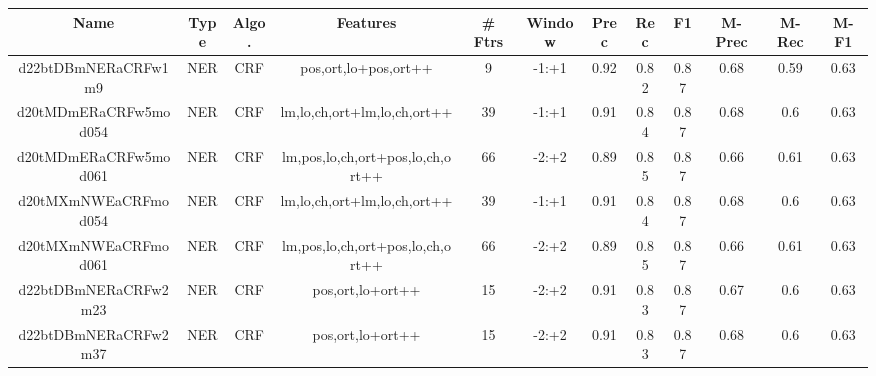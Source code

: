 \documentclass[a4paper]{article}
\begin{document}
\begin{landscape}
\begin{center}
\begin{tabular}{ |c|c|c|c|c|c|c|c|c|c|c|c|} 
 \hline
 	Name & Type & Algo. & Features & \# Ftrs & Window & Prec & Rec & F1 & M-Prec & M-Rec & M-F1\\
 \hline

 		

 	
 
 	
 		
 		\small{ d22btDBmNERaCRFw1m9 } & NER & CRF & pos,ort,lo+pos,ort++  &  9 &  -1:+1  &  0.92 & 0.82 & 0.87  &  0.68 & 0.59 & 0.63 \\
 		

 	
 
 	
 		
 		\small{ d20tMDmERaCRFw5mod054 } & NER & CRF & lm,lo,ch,ort+lm,lo,ch,ort++  &  39 &  -1:+1  &  0.91 & 0.84 & 0.87  &  0.68 & 0.6 & 0.63 \\
 		

 	
 
 	
 		
 		\small{ d20tMDmERaCRFw5mod061 } & NER & CRF & lm,pos,lo,ch,ort+pos,lo,ch,ort++  &  66 &  -2:+2  &  0.89 & 0.85 & 0.87  &  0.66 & 0.61 & 0.63 \\
 		

 	
 
 	
 		
 		\small{ d20tMXmNWEaCRFmod054 } & NER & CRF & lm,lo,ch,ort+lm,lo,ch,ort++  &  39 &  -1:+1  &  0.91 & 0.84 & 0.87  &  0.68 & 0.6 & 0.63 \\
 		

 	
 
 	
 		
 		\small{ d20tMXmNWEaCRFmod061 } & NER & CRF & lm,pos,lo,ch,ort+pos,lo,ch,ort++  &  66 &  -2:+2  &  0.89 & 0.85 & 0.87  &  0.66 & 0.61 & 0.63 \\
 		

 	
 
 	
 		
 		\small{ d22btDBmNERaCRFw2m23 } & NER & CRF & pos,ort,lo+ort++  &  15 &  -2:+2  &  0.91 & 0.83 & 0.87  &  0.67 & 0.6 & 0.63 \\
 		

 	
 
 	
 		
 		\small{ d22btDBmNERaCRFw2m37 } & NER & CRF & pos,ort,lo+ort++  &  15 &  -2:+2  &  0.91 & 0.83 & 0.87  &  0.68 & 0.6 & 0.63 \\
 		


\end{tabular}
\end{center}
\end{landscape}
\end{document}
